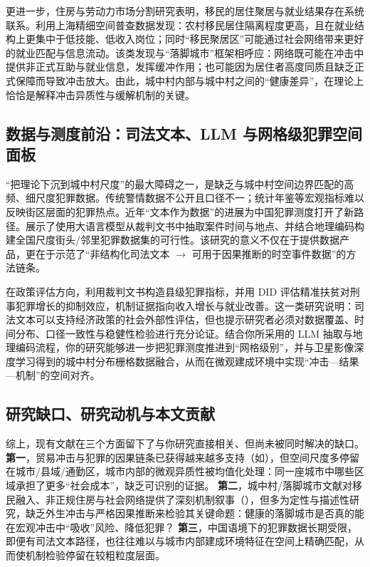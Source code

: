 更进一步，住房与劳动力市场分割研究表明，移民的居住聚居与就业结果存在系统联系。\citet{liu2016segmentation}利用上海精细空间普查数据发现：农村移民居住隔离程度更高，且在就业结构上更集中于低技能、低收入岗位；同时“移民聚居区”可能通过社会网络带来更好的就业匹配与信息流动。该类发现与“落脚城市”框架相呼应：网络既可能在冲击中提供非正式互助与就业信息，发挥缓冲作用；也可能因为居住者高度同质且缺乏正式保障而导致冲击放大。由此，城中村内部与城中村之间的“健康差异”，在理论上恰恰是解释冲击异质性与缓解机制的关键。

\subsection{数据与测度前沿：司法文本、LLM 与网格级犯罪空间面板}
\label{subsec:llm_crime_cn}

“把理论下沉到城中村尺度”的最大障碍之一，是缺乏与城中村空间边界匹配的高频、细尺度犯罪数据。传统警情数据不公开且口径不一；统计年鉴等宏观指标难以反映街区层面的犯罪热点。近年“文本作为数据”的进展为中国犯罪测度打开了新路径。\citet{zhang2025llm}展示了使用大语言模型从裁判文书中抽取案件时间与地点、并结合地理编码构建全国尺度街头/邻里犯罪数据集的可行性。该研究的意义不仅在于提供数据产品，更在于示范了“非结构化司法文本 $\rightarrow$ 可用于因果推断的时空事件数据”的方法链条。

在政策评估方向，\citet{yi2023povertycrime}利用裁判文书构造县级犯罪指标，并用 DID 评估精准扶贫对刑事犯罪增长的抑制效应，机制证据指向收入增长与就业改善。这一类研究说明：司法文本可以支持经济政策的社会外部性评估，但也提示研究者必须对数据覆盖、时间分布、口径一致性与稳健性检验进行充分论证。结合你所采用的 LLM 抽取与地理编码流程，你的研究能够进一步把犯罪测度推进到“网格级别”，并与卫星影像深度学习得到的城中村分布栅格数据融合，从而在微观建成环境中实现“冲击—结果—机制”的空间对齐。

\subsection{研究缺口、研究动机与本文贡献}
\label{subsec:gap_contrib_cn}

综上，现有文献在三个方面留下了与你研究直接相关、但尚未被同时解决的缺口。
\textbf{第一}，贸易冲击与犯罪的因果链条已获得越来越多支持（如\citealp{dixcarneirosoaresulyssea2018economic,ma2025export}），但空间尺度多停留在城市/县域/通勤区，城市内部的微观异质性被均值化处理：同一座城市中哪些区域承担了更多“社会成本”，缺乏可识别的证据。%
\textbf{第二}，城中村/落脚城市文献对移民融入、非正规住房与社会网络提供了深刻机制叙事（\citealp{saunders2010arrival,wang2009urbanization}），但多为定性与描述性研究，缺乏外生冲击与严格因果推断来检验其关键命题：健康的落脚城市是否真的能在宏观冲击中“吸收”风险、降低犯罪？%
\textbf{第三}，中国语境下的犯罪数据长期受限，即便有司法文本路径，也往往难以与城市内部建成环境特征在空间上精确匹配，从而使机制检验停留在较粗粒度层面。

